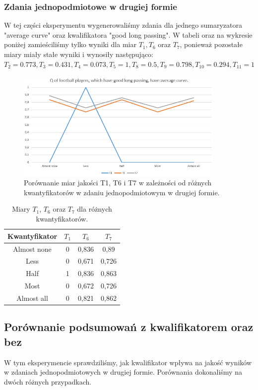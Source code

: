 \documentclass{classrep}
\begin{document}
	\subsubsection{Zdania jednopodmiotowe w drugiej formie}	
	W tej części eksperymentu wygenerowaliśmy zdania dla jednego sumaryzatora "average curve" oraz kwalifikatora "good long passing".
	W tabeli oraz na wykresie poniżej zamieściliśmy tylko wyniki dla miar $T_1, T_6$ oraz $T_7$, ponieważ pozostałe miary miały stałe wyniki i wynosiły następująco: $T_2 = 0.773, T_3 = 0.431, T_4 = 0.073, T_5 = 1, T_8 = 0.5, T_9 = 0.798, T_{10} = 0.294, T_{11} = 1$
	
	\begin{figure}[h!]
		\centering
		\includegraphics[width=0.9\textwidth]{ex/1b.png}
		\caption{Porównanie miar jakości T1, T6 i T7 w zależności od różnych kwantyfikatorów w zdaniu jednopodmiotowym w drugiej formie.}
		\label{wykresex1b}
	\end{figure}
	
	\begin{table}[h!]
		\centering
		\begin{tabular} {c c c c}
			\hline
			\textbf{Kwantyfikator} & \textbf{$T_1$} & \textbf{$T_6$} & \textbf{$T_7$} \\ [0.5ex] 
			\hline	
			\hline 
			Almost none	& 0 &	0,836 &	0,89 \\
			Less	& 0	& 0,671	& 0,726 \\
			Half	& 1 &	0,836	& 0,863 \\
			Most	& 0 &	0,672	& 0,726 \\ 
			Almost all & 0 &	0,821	& 0,862 \\ 				
			\hline			
		\end{tabular}
		\caption{Miary $T_1$, $T_6$ oraz $T_7$ dla różnych kwantyfikatorów. }
		\label{tabelaex1b}
	\end{table}
	
	\newpage
	\subsection{Porównanie podsumowań z kwalifikatorem oraz bez}
	W tym eksperymencie sprawdziliśmy, jak kwalifikator wpływa na jakość wyników w zdaniach jednopodmiotowych w drugiej formie. Porównania dokonaliśmy na dwóch różnych przypadkach.
	
\end{document}
